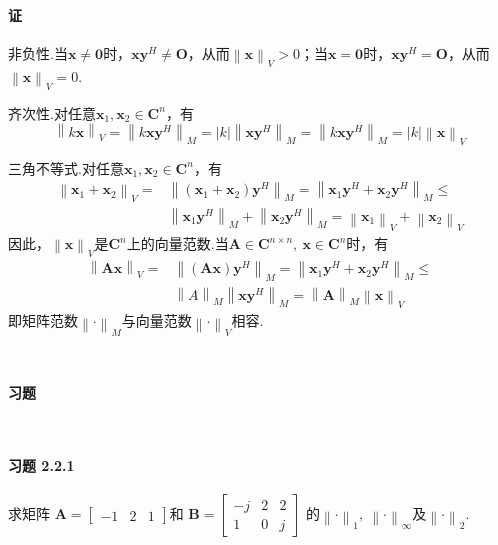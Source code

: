 \documentclass[12pt, a4paper, oneside, fontset=none]{ctexart}
\begin{document}
\paragraph*{证}
非负性.当$\bm{x} \neq \bm{0}$时，$\bm{xy}^H \neq \bm{O}$，从而$\left\lVert \bm{x} \right\rVert _V > 0$；当$\bm{x} = \bm{0}$时，$\bm{xy}^H = \bm{O}$，从而$\left\lVert \bm{x} \right\rVert _V = 0$.\par
齐次性.对任意$\bm{x}_1,\bm{x}_2 \in \bm{C}^n$，有
\[
    \left\lVert k\bm{x} \right\rVert _V = \left\lVert k\bm{xy}^H \right\rVert _M = \left\lvert k \right\rvert \left\lVert \bm{xy}^H \right\rVert _M = \left\lVert k\bm{xy}^H \right\rVert _M = \left\lvert k \right\rvert \left\lVert \bm{x} \right\rVert _V
\] \par
三角不等式.对任意$\bm{x}_1,\bm{x}_2 \in \bm{C}^n$，有
\begin{align*}
    \left\lVert \bm{x}_1 + \bm{x}_2 \right\rVert _V  = & \left\lVert (\bm{x}_1 + \bm{x}_2)\bm{y}^H \right\rVert _M = \left\lVert \bm{x}_1\bm{y}^H + \bm{x}_2\bm{y}^H \right\rVert _M \leqslant                                     \\
                                                       & \left\lVert \bm{x}_1\bm{y}^H \right\rVert _M + \left\lVert \bm{x}_2\bm{y}^H \right\rVert _M = \left\lVert \bm{x}_1 \right\rVert _V + \left\lVert \bm{x}_2 \right\rVert _V
\end{align*}
因此，$\left\lVert \bm{x} \right\rVert _V$是$\bm{C}^n$上的向量范数.当$\bm{A} \in \bm{C}^{n\times n},\ \bm{x} \in \bm{C}^n$时，有
\begin{align*}
    \left\lVert \bm{Ax} \right\rVert _V = & \left\lVert (\bm{Ax})\bm{y}^H \right\rVert _M = \left\lVert \bm{x}_1\bm{y}^H + \bm{x}_2\bm{y}^H \right\rVert _M \leqslant                   \\
                                          & \left\lVert A \right\rVert _M \left\lVert \bm{xy}^H \right\rVert _M = \left\lVert \bm{A} \right\rVert _M \left\lVert \bm{x} \right\rVert _V
\end{align*}
即矩阵范数$\left\lVert \bm{\cdot} \right\rVert _M$与向量范数$\left\lVert \bm{\cdot} \right\rVert _V$相容.

\par \ \par

\centerline{\large{\textbf{习题}}} \ \par

\paragraph*{习题 2.2.1} 求矩阵
$\bm{A} = \begin{bmatrix}
        -1 & 2 & 1
    \end{bmatrix}$和
$\bm{B} = \begin{bmatrix}
        -j & 2 & 2 \\
        1  & 0 & j
    \end{bmatrix}$
的$\left\lVert \bm{\cdot} \right\rVert _ 1,\ \left\lVert \bm{\cdot} \right\rVert _\infty$及$\left\lVert \bm{\cdot} \right\rVert _2$.
\end{document}
